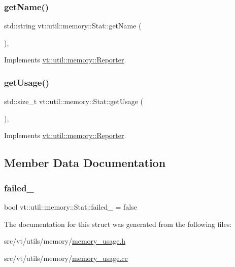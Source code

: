 \subsubsection{\texorpdfstring{get\+Name()}{getName()}}
{\footnotesize\ttfamily std\+::string vt\+::util\+::memory\+::\+Stat\+::get\+Name (\begin{DoxyParamCaption}{ }\end{DoxyParamCaption})\hspace{0.3cm}{\ttfamily [override]}, {\ttfamily [virtual]}}



Implements \hyperlink{structvt_1_1util_1_1memory_1_1_reporter_a83fc36e9cff3ce2deedf1d4546694713}{vt\+::util\+::memory\+::\+Reporter}.

\mbox{\label{structvt_1_1util_1_1memory_1_1_stat_aa14297e6605a523e4164597d45fba06f}} 
\subsubsection{\texorpdfstring{get\+Usage()}{getUsage()}}
{\footnotesize\ttfamily std\+::size\+\_\+t vt\+::util\+::memory\+::\+Stat\+::get\+Usage (\begin{DoxyParamCaption}{ }\end{DoxyParamCaption})\hspace{0.3cm}{\ttfamily [override]}, {\ttfamily [virtual]}}



Implements \hyperlink{structvt_1_1util_1_1memory_1_1_reporter_a372574f51fdb68077cd3d227ee373de5}{vt\+::util\+::memory\+::\+Reporter}.



\subsection{Member Data Documentation}
\mbox{\label{structvt_1_1util_1_1memory_1_1_stat_af94103c0d6758baa6386de53c30f6246}} 
\subsubsection{\texorpdfstring{failed\+\_\+}{failed\_}}
{\footnotesize\ttfamily bool vt\+::util\+::memory\+::\+Stat\+::failed\+\_\+ = false\hspace{0.3cm}{\ttfamily [private]}}



The documentation for this struct was generated from the following files\+:\begin{DoxyCompactItemize}
\item 
src/vt/utils/memory/\hyperlink{memory__usage_8h}{memory\+\_\+usage.\+h}\item 
src/vt/utils/memory/\hyperlink{memory__usage_8cc}{memory\+\_\+usage.\+cc}\end{DoxyCompactItemize}

